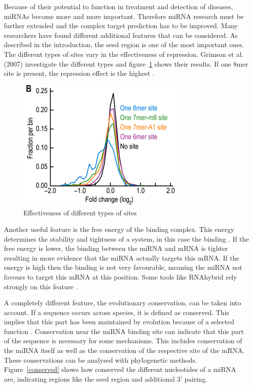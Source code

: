 \documentclass[12pt]{article}
\begin{document}
Because of their potential to function in treatment and detection of diseases, miRNAs become more and more important. Therefore miRNA research must be further extended and the complex target prediction has to be improved. Many researchers have found different additional features that can be considered. As described in the introduction, the seed region is one of the most important ones. The different types of sites vary in the effectiveness of repression. Grimson et al. (2007) investigate the different types and figure~\ref{types} shows their results. If one 8mer site is present, the repression effect is the highest \cite{Grimson}.


\begin{figure}[h]
\centering
\includegraphics[scale=0.6]{results/site_3addi.png}
\caption{Effectiveness of different types of sites}
\label{types}
\end{figure}

Another useful feature is the free energy of the binding complex. This energy determines the stability and tightness of a  system, in this case the binding \cite{Peterson}. If the free energy is lower, the binding between the miRNA and mRNA is tighter resulting in more evidence that the miRNA actually targets this mRNA. If the energy is high then the binding is not very favourable, meaning the miRNA not favours to target this mRNA at this position. Some tools like RNAhybrid rely strongly on this feature \cite{Rehmsmeier}. 

A completely different feature, the evolutionary conservation, can be taken into account. If a sequence occurs across species, it is defined as conserved. This implies that this part has been maintained by evolution because of a selected function \cite{Peterson}. Conservation near the miRNA binding site can indicate that this part of the sequence is necessary for some mechanisms. This includes conservation of the miRNA itself as well as the conservation of the respective site of the mRNA. These conservations can be analysed with phylogenetic methods. Figure~\ref{conserved} shows how conserved the different nucleotides of a miRNA are, indicating regions like the seed region and additional 3' pairing. 
\end{document}
